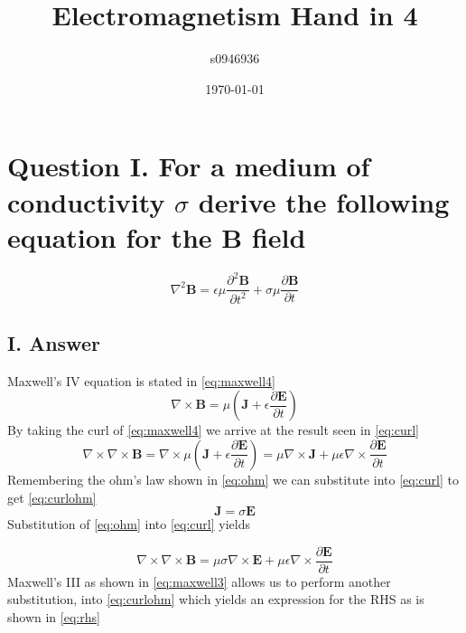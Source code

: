 \documentclass[12pt]{article}
\title{Electromagnetism Hand in 4}
\author{s0946936}
\date{\today}
\begin{document}
\maketitle

\section*{Question I. For a medium of conductivity $\sigma$ derive the following equation for the B field}

\begin{equation}
\label{eq:identity}
 \nabla^{2}\mathbf{B}=\epsilon\mu \frac{\partial^{2} \mathbf{B}}{\partial t^{2}}+\sigma\mu \frac{\partial \mathbf{B}}{\partial t}
\end{equation}

\subsection*{I. Answer}

Maxwell's IV equation is stated in \cref{eq:maxwell4}
\begin{equation}
\label{eq:maxwell4}
\nabla \times \mathbf{B} =\mu\left( \mathbf{J} +\epsilon \frac{\partial \mathbf{E}} {\partial t} \right)
\end{equation}
By taking the curl of \cref{eq:maxwell4} we arrive at the result seen in \cref{eq:curl} 
\begin{equation}
\label{eq:curl}
\nabla\times \nabla \times \mathbf{B}=\nabla \times \mu\left( \mathbf{J} +\epsilon \frac{\partial \mathbf{E}} {\partial t} \right)=
\mu \nabla \times  \mathbf{J} +\mu \epsilon \nabla\times \frac{\partial \mathbf{E}} {\partial t}
\end{equation}
Remembering the ohm's law shown in \cref{eq:ohm} we can substitute into \cref{eq:curl} to get \cref{eq:curlohm}
\begin{equation}
\label{eq:ohm}
\mathbf{J}=\sigma\mathbf{E}
\end{equation}
\noindent
Substitution of \cref{eq:ohm} into \cref{eq:curl} yields 

\begin{equation}
\label{eq:curlohm}
 \nabla \times\nabla \times \mathbf{B}=\mu \sigma\nabla \times \mathbf{E}+\mu \epsilon \nabla \times  \frac{\partial \mathbf{E}} {\partial t} 
\end{equation}
\noindent
Maxwell's III as shown in \cref{eq:maxwell3} allows us to perform another substitution, into \cref{eq:curlohm} which yields an expression for the RHS as is shown in \cref{eq:rhs}
\end{document}
